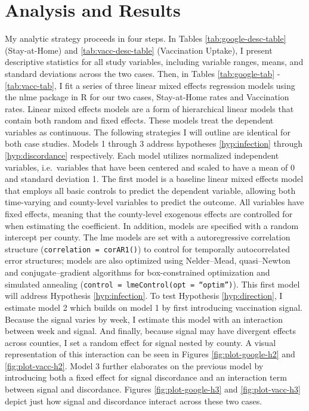 \hypertarget{analysis-and-results}{\section{Analysis and Results}\label{analysis-and-results}}

My analytic strategy proceeds in four steps. In Tables
\ref{tab:google-desc-table} (Stay-at-Home) and \ref{tab:vacc-desc-table}
(Vaccination Uptake), I present descriptive statistics for all study variables,
including variable ranges, means, and standard deviations across the two cases.
Then, in Tables \ref{tab:google-tab} - \ref{tab:vacc-tab}, I fit a series of
three linear mixed effects regression models using the nlme package in R
\citep{pinheiro_etal21, pinheiro_bates00} for our two cases, Stay-at-Home rates
and Vaccination rates. Linear mixed effects models are a form of hierarchical
linear models that contain both random and fixed effects. These models treat the
dependent variables as continuous. The following strategies I will outline are
identical for both case studies. Models 1 through 3 address hypotheses
\ref{hyp:infection} through \ref{hyp:discordance} respectively. Each model
utilizes normalized independent variables, i.e.\ variables that have been
centered and scaled to have a mean of 0 and standard deviation 1. The first
model is a baseline linear mixed effects model that employs all basic controls
to predict the dependent variable, allowing both time-varying and county-level
variables to predict the outcome. All variables have fixed effects, meaning that
the county-level exogenous effects are controlled for when estimating the
coefficient. In addition, models are specified with a random intercept per
county. The lme models are set with a autoregressive correlation structure
(\texttt{correlation\ =\ corAR1()}) to control for temporally autocorrelated
error structures; models are also optimized using Nelder--Mead, quasi--Newton and
conjugate--gradient algorithms for box-constrained optimization and simulated
annealing (\texttt{control\ =\ lmeControl(opt\ =\ ``optim'')}). This first model
will address Hypothesis \ref{hyp:infection}. To test Hypothesis
\ref{hyp:direction}, I estimate model 2 which builds on model 1 by first
introducing vaccination signal. Because the signal varies by week, I estimate
this model with an interaction between week and signal. And finally, because
signal may have divergent effects across counties, I set a random effect for
signal nested by county. A visual representation of this interaction can be seen
in Figures \ref{fig:plot-google-h2} and \ref{fig:plot-vacc-h2}. Model 3 further
elaborates on the previous model by introducing both a fixed effect for signal
discordance and an interaction term between signal and discordance. Figures
\ref{fig:plot-google-h3} and \ref{fig:plot-vacc-h3} depict just how signal and
discordance interact across these two cases.

